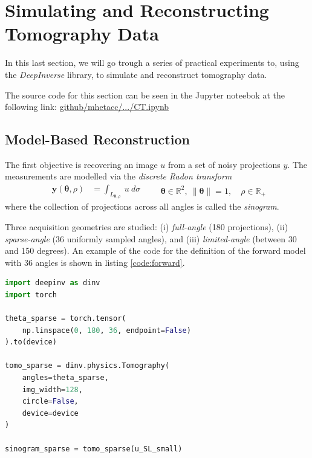 \section{Simulating and Reconstructing Tomography Data}

In this last section, we will go trough a series of practical experiments to, using the \textit{DeepInverse} library, to simulate and reconstruct tomography data.

The source code for this section can be seen in the Jupyter noteebok at the following link: \href{https://github.com/mhetacc/CIL/blob/6830cc50b972bd39f5c5c328295af87e33732a38/notebooks/CompleteCTlab.ipynb}{github/mhetacc/.../CT.ipynb}

\subsection{Model-Based Reconstruction}

The first objective is recovering an image $u$ from a set of noisy projections $y$. The measurements are modelled via the \textit{discrete Radon transform}
\begin{equation}
    \begin{aligned} \mathbf{y}(\boldsymbol{\theta},\rho) &= \int_{L_{\boldsymbol{\theta},\rho}}~u~d\sigma
    \end{aligned} \qquad \boldsymbol{\theta} \in \mathbb{R}^2,~ \| \boldsymbol{\theta}\|=1, \quad \rho \in \mathbb{R}_+
\end{equation}
where the collection of projections across all angles is called the \textit{sinogram}. 

Three acquisition geometries are studied: (i) \textit{full-angle} (180 projections), (ii) \textit{sparse-angle} (36 uniformly sampled angles), and (iii) \textit{limited-angle} (between 30 and 150 degrees). An example of the code for the definition of the forward model with 36 angles is shown in listing \ref{code:forward}.

\begin{lstlisting}[language=Python, label={code:forward}, caption={Defining the sparse-angle CT forward model with \textit{deepinv}.}]
import deepinv as dinv
import torch

theta_sparse = torch.tensor(
    np.linspace(0, 180, 36, endpoint=False)
).to(device)

tomo_sparse = dinv.physics.Tomography(
    angles=theta_sparse,
    img_width=128,
    circle=False,
    device=device
)

sinogram_sparse = tomo_sparse(u_SL_small)
\end{lstlisting}


